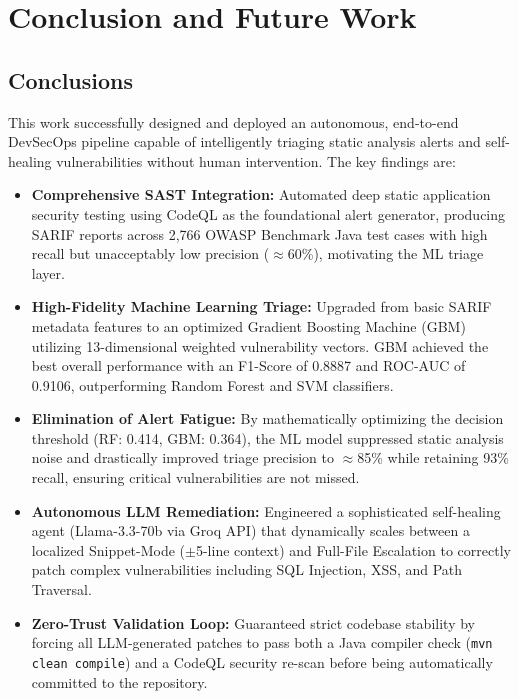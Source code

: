 \chapter{Conclusion and Future Work}
\label{ch:conclusion}

\section{Conclusions}

This work successfully designed and deployed an autonomous, end-to-end DevSecOps pipeline
capable of intelligently triaging static analysis alerts and self-healing vulnerabilities
without human intervention. The key findings are:

\begin{itemize}
  \item \textbf{Comprehensive SAST Integration:} Automated deep static application
        security testing using CodeQL as the foundational alert generator, producing
        SARIF reports across 2,766 OWASP Benchmark Java test cases with high recall
        but unacceptably low precision ($\approx$60\%), motivating the ML triage layer.

  \item \textbf{High-Fidelity Machine Learning Triage:} Upgraded from basic SARIF
        metadata features to an optimized Gradient Boosting Machine (GBM) utilizing
        13-dimensional weighted vulnerability vectors. GBM achieved the best overall
        performance with an F1-Score of 0.8887 and ROC-AUC of 0.9106, outperforming
        Random Forest and SVM classifiers.

  \item \textbf{Elimination of Alert Fatigue:} By mathematically optimizing the
        decision threshold (RF: 0.414, GBM: 0.364), the ML model suppressed static
        analysis noise and drastically improved triage precision to $\approx$85\%
        while retaining 93\% recall, ensuring critical vulnerabilities are not missed.

  \item \textbf{Autonomous LLM Remediation:} Engineered a sophisticated self-healing
        agent (Llama-3.3-70b via Groq API) that dynamically scales between a
        localized Snippet-Mode ($\pm$5-line context) and Full-File Escalation to
        correctly patch complex vulnerabilities including SQL Injection, XSS, and
        Path Traversal.

  \item \textbf{Zero-Trust Validation Loop:} Guaranteed strict codebase stability by
        forcing all LLM-generated patches to pass both a Java compiler check
        (\texttt{mvn clean compile}) and a CodeQL security re-scan before being
        automatically committed to the repository.
\end{itemize}

